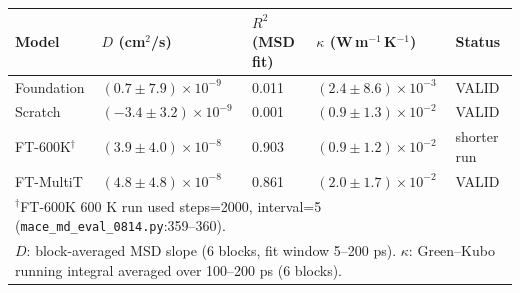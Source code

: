 \begin{tabular}{lllll}
\toprule
Model & $D$ (cm$^2$/s) & $R^2$ (MSD fit) & $\kappa$ (W\,m$^{-1}$\,K$^{-1}$) & Status \\
\midrule
Foundation & $(0.7 \pm 7.9) \times 10^{-9}$ & 0.011 & $(2.4 \pm 8.6) \times 10^{-3}$ & VALID \\
Scratch & $(-3.4 \pm 3.2) \times 10^{-9}$ & 0.001 & $(0.9 \pm 1.3) \times 10^{-2}$ & VALID \\
FT-600K$^{\dagger}$ & $(3.9 \pm 4.0) \times 10^{-8}$ & 0.903 & $(0.9 \pm 1.2) \times 10^{-2}$ & shorter run \\
FT-MultiT & $(4.8 \pm 4.8) \times 10^{-8}$ & 0.861 & $(2.0 \pm 1.7) \times 10^{-2}$ & VALID \\
\bottomrule
\multicolumn{5}{l}{\footnotesize $^{\dagger}$FT-600K 600 K run used steps=2000, interval=5 (\texttt{mace\_md\_eval\_0814.py}:359--360).} \\
\multicolumn{5}{l}{\footnotesize $D$: block-averaged MSD slope (6 blocks, fit window 5--200 ps). $\kappa$: Green--Kubo running integral averaged over 100--200 ps (6 blocks).} \\
\end{tabular}
